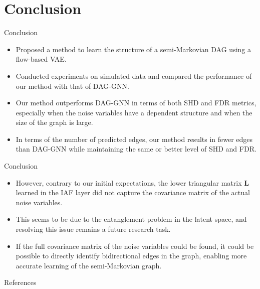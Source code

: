 \documentclass{beamer}
\begin{document}
\section{Conclusion}

\begin{frame}{Conclusion}
    \begin{itemize}
        \item Proposed a method to learn the structure of a semi-Markovian DAG using a flow-based VAE.
        \item Conducted experiments on simulated data and compared the performance of our method with that of DAG-GNN.
        \item Our method outperforms DAG-GNN in terms of both SHD and FDR metrics, especially when the noise variables have a dependent structure and when the size of the graph is large.
        \item In terms of the number of predicted edges, our method results in fewer edges than DAG-GNN while maintaining the same or better level of SHD and FDR. 
    \end{itemize}
\end{frame}

\begin{frame}{Conclusion}
    \begin{itemize}
        \item However, contrary to our initial expectations, the lower triangular matrix $\mathbf L$ learned in the IAF layer did not capture the covariance matrix of the actual noise variables.
        \item This seems to be due to the entanglement problem in the latent space, and resolving this issue remains a future research task.
        \item If the full covariance matrix of the noise variables could be found, it could be possible to directly identify bidirectional edges in the graph, enabling more accurate learning of the semi-Markovian graph.
    \end{itemize} 
\end{frame}





\begin{frame}[allowframebreaks]{References}
\printbibliography
\end{frame}
\end{document}
